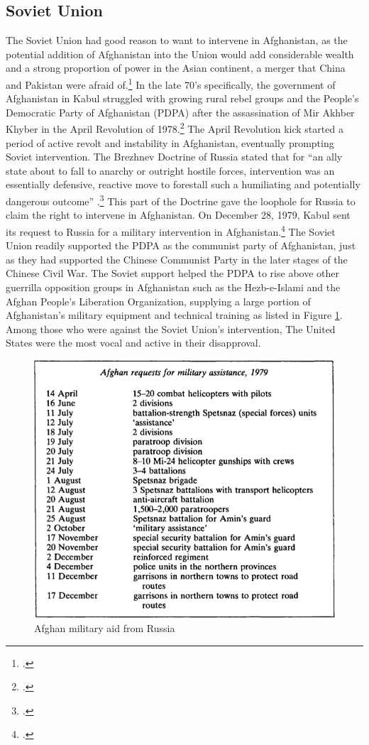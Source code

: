 \documentclass[12pt,letterpaper]{article}
\begin{document}
\subsection{Soviet Union}
The Soviet Union had good reason to want to intervene in Afghanistan, as the potential addition of Afghanistan into the Union would add considerable wealth and a strong proportion of power in the Asian continent, a merger that China and Pakistan were afraid of.\footcite[24-25]{urban_war_1990} In the late 70's specifically, the government of Afghanistan in Kabul struggled with growing rural rebel groups and the People's Democratic Party of Afghanistan (PDPA) after the assassination of Mir Akhber Khyber in the April Revolution of 1978.\footcite[15]{urban_war_1990} The April Revolution kick started a period of active revolt and instability in Afghanistan, eventually prompting Soviet intervention. The Brezhnev Doctrine of Russia stated that for ``an ally state about to fall to anarchy or outright hostile forces, intervention was an essentially defensive, reactive move to forestall such a humiliating and potentially dangerous outcome'' \citeauthor{galeotti_afghanistan:_2012}.\footcite[11]{galeotti_afghanistan:_2012} This part of the Doctrine gave the loophole for Russia to claim the right to intervene in Afghanistan. On December 28, 1979, Kabul sent its request to Russia for a military intervention in Afghanistan.\footcite[559]{guttmann_cold_1988} The Soviet Union readily supported the PDPA as the communist party of Afghanistan, just as they had supported the Chinese Communist Party in the later stages of the Chinese Civil War. The Soviet support helped the PDPA to rise above other guerrilla opposition groups in Afghanistan such as the Hezb-e-Islami and the Afghan People's Liberation Organization, supplying a large portion of Afghanistan's military equipment and technical training as listed in Figure \ref{fig:requests}. Among those who were against the Soviet Union's intervention, The United States were the most vocal and active in their disapproval.

\begin{figure}[H]
	\centering
	\caption{Afghan military aid from Russia \autocite[8]{galeotti_afghanistan:_2012}}
	\label{fig:requests}
	\includegraphics[width=.7\linewidth]{requests}
\end{figure}
\end{document}
